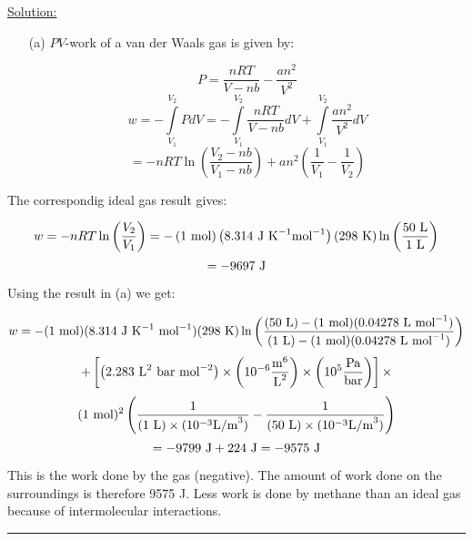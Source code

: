 \noindent
\underline{Solution:}\\

\begin{itemize}

\item[(a)] $PV$-work of a van der Waals gas is given by:

$$P = \frac{nRT}{V - nb} - \frac{an^2}{V^2}$$
$$w = -\int\limits_{V_1}^{V_2}PdV = -\int\limits_{V_1}^{V_2}\frac{nRT}{V - nb}dV + \int\limits_{V_1}^{V_2}\frac{an^2}{V^2}dV$$
$$ = -nRT\ln\left(\frac{V_2 - nb}{V_1 - nb}\right) + an^2\left(\frac{1}{V_1} - \frac{1}{V_2}\right)$$
\end{itemize}

\item[(b)] The correspondig ideal gas result gives:

$$w = -nRT\ln\left(\frac{V_2}{V_1}\right) = -\left(1\textnormal{ mol}\right)\left(8.314\textnormal{ J K}^{-1}\textnormal{mol}^{-1}\right)\left(298\textnormal{ K}\right)\ln\left(\frac{50\textnormal{ L}}{1\textnormal{ L}}\right)$$
$$ = -9697\textnormal{ J}$$

\item[(c)] Using the result in (a) we get:

$$w = -(1\textnormal{ mol})(8.314\textnormal{ J K}^{-1}\textnormal{ mol}^{-1})(298\textnormal{ K})\ln\left(\frac{(50\textnormal{ L}) - (1\textnormal{ mol})(0.04278\textnormal{ L mol}^{-1})}{(1\textnormal{ L}) - (1\textnormal{ mol})(0.04278\textnormal{ L mol}^{-1})}\right)$$
$$ + \left[\left(2.283\textnormal{ L}^2\textnormal{ bar mol}^{-2}\right)\times\left(10^{-6}\frac{\textnormal{m}^6}{\textnormal{L}^2}\right)\times\left(10^5\frac{\textnormal{Pa}}{\textnormal{bar}}\right)\right]\times$$
$$(1\textnormal{ mol})^2\left(\frac{1}{(1\textnormal{ L})\times(10^{-3}\textnormal{L/m}^3)} - \frac{1}{(50\textnormal{ L})\times(10^{-3}\textnormal{L/m}^3)}\right)$$
$$ = -9799\textnormal{ J} + 224\textnormal{ J} = -9575\textnormal{ J}$$

This is the work done by the gas (negative). The amount of work done on the surroundings is therefore 9575 J. Less work is done by methane than an ideal gas because of intermolecular interactions.

\hrule\vspace{0.5cm}
